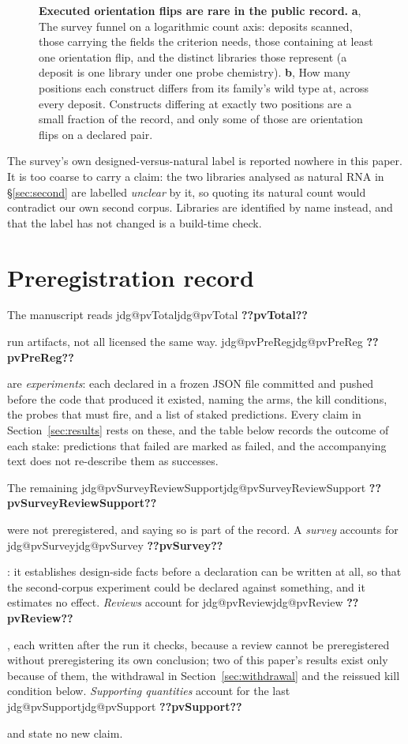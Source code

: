 \documentclass[11pt]{article}
\makeatletter
\newcommand{\jdg}[1]{%
  \ifcsname jdg@#1\endcsname\csname jdg@#1\endcsname
  \else\textbf{??#1??}\PackageError{nm}{undefined measured quantity #1}{}\fi}
\makeatother
\begin{document}
\begin{figure}[!htbp]
\centering

\caption{\textbf{Executed orientation flips are rare in the public record.} \textbf{a}, The survey
funnel on a logarithmic count axis: deposits scanned, those carrying the fields the criterion
needs, those containing at least one orientation flip, and the distinct libraries those represent (a deposit is one library under one probe chemistry). \textbf{b}, How many positions each
construct differs from its family's wild type at, across every deposit. Constructs differing at
exactly two positions are a small fraction of the record, and only some of those are orientation
flips on a declared pair.}
\label{fig:survey}
\end{figure}

The survey's own designed-versus-natural label is reported nowhere in this paper. It is too coarse
to carry a claim: the two libraries analysed as natural RNA in \S\ref{sec:second} are labelled
\emph{unclear} by it, so quoting its natural count would contradict our own second corpus.
Libraries are identified by name instead, and that the label has not changed is a build-time
check.

\FloatBarrier
\section{Preregistration record}
\label{app:prereg}

The manuscript reads \jdg{pvTotal} run artifacts, not all licensed the same way. \jdg{pvPreReg}
are \emph{experiments}: each declared in a frozen JSON file committed and pushed before the code
that produced it existed, naming the arms, the kill conditions, the probes that must fire, and a
list of staked predictions. Every claim in Section~\ref{sec:results} rests on these, and the table
below records the outcome of each stake: predictions that failed are marked as failed, and the
accompanying text does not re-describe them as successes.

The remaining \jdg{pvSurveyReviewSupport} were not preregistered, and saying so is part of the
record. A \emph{survey} accounts for \jdg{pvSurvey}: it establishes design-side facts before a
declaration can be written at all, so that the second-corpus experiment could be declared against
something, and it estimates no effect. \emph{Reviews} account for \jdg{pvReview}, each written
after the run it checks, because a review cannot be preregistered without preregistering its own
conclusion; two of this paper's results exist only because of them, the withdrawal in
Section~\ref{sec:withdrawal} and the reissued kill condition below. \emph{Supporting quantities}
account for the last \jdg{pvSupport} and state no new claim.
\end{document}
